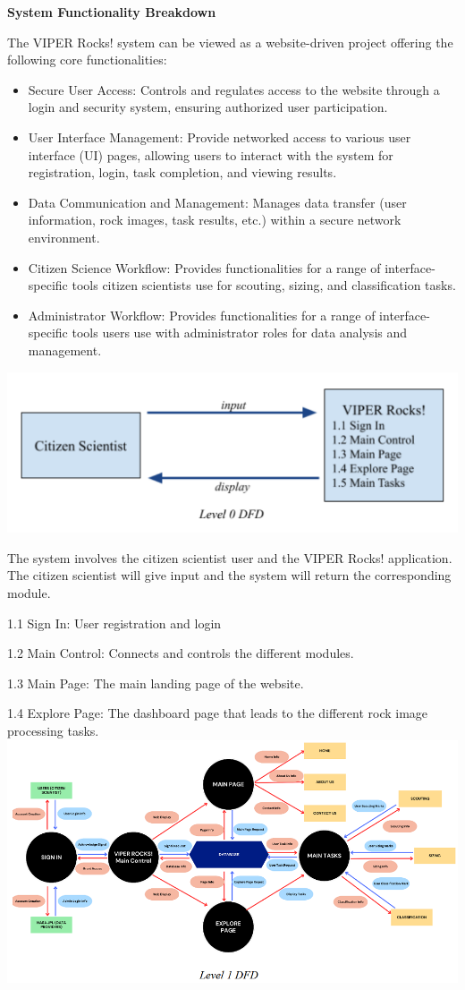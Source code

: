 \documentclass{article}
\begin{document}
\textbf{System Functionality Breakdown}

The VIPER Rocks! system can be viewed as a website-driven project offering the following core functionalities:
\begin{itemize}
	\item Secure User Access: Controls and regulates access to the website through a login and security system, ensuring authorized user participation.
	\item User Interface Management: Provide networked access to various user interface (UI) pages, allowing users to interact with the system for registration, login, task completion, and viewing results.
	\item Data Communication and Management: Manages data transfer (user information, rock images, task results, etc.) within a secure network environment.
	\item Citizen Science Workflow: Provides functionalities for a range of interface-specific tools citizen scientists use for scouting, sizing, and classification tasks.
	\item Administrator Workflow: Provides functionalities for a range of interface-specific tools users use with administrator roles for data analysis and management.
\end{itemize}
\includegraphics{DFD_0}

The system involves the citizen scientist user and the VIPER Rocks! application. The citizen scientist will give input and the system will return the corresponding module.

1.1 Sign In: User registration and login

1.2 Main Control: Connects and controls the different modules.

1.3 Main Page: The main landing page of the website.

1.4 Explore Page: The dashboard page that leads to the different rock image processing tasks.
\includegraphics{DFD_1}
\end{document}
